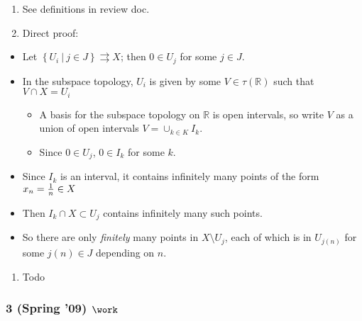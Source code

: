 \begin{solution}

\envlist

\begin{enumerate}
\def\labelenumi{\alph{enumi}.}
\item
  See definitions in review doc.
\item
  Direct proof:
\end{enumerate}

\begin{itemize}
\tightlist
\item
  Let
  \(\left\{{U_i {~\mathrel{\Big|}~}j\in J}\right\}\rightrightarrows X\);
  then \(0\in U_j\) for some \(j\in J\).
\item
  In the subspace topology, \(U_i\) is given by some
  \(V\in \tau({\mathbb{R}})\) such that \(V\cap X = U_i\)

  \begin{itemize}
  \tightlist
  \item
    A basis for the subspace topology on \({\mathbb{R}}\) is open
    intervals, so write \(V\) as a union of open intervals
    \(V = \cup_{k\in K} I_k\).
  \item
    Since \(0\in U_j\), \(0\in I_k\) for some \(k\).
  \end{itemize}
\item
  Since \(I_k\) is an interval, it contains infinitely many points of
  the form \(x_n = {1 \over n} \in X\)
\item
  Then \(I_k \cap X \subset U_j\) contains infinitely many such points.
\item
  So there are only \emph{finitely} many points in \(X\setminus U_j\),
  each of which is in \(U_{j(n)}\) for some \(j(n) \in J\) depending on
  \(n\).
\end{itemize}

\begin{enumerate}
\def\labelenumi{\alph{enumi}.}
\setcounter{enumi}{2}
\tightlist
\item
  Todo
\end{enumerate}


\end{solution}

\hypertarget{spring-09-work}{%
\subsubsection{\texorpdfstring{3 (Spring '09)
\(\work\)}{3 (Spring '09) \textbackslash work}}\label{spring-09-work}}

